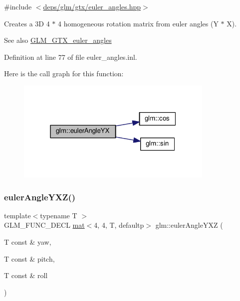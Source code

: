 {\ttfamily \#include $<$\hyperlink{euler__angles_8hpp}{deps/glm/gtx/euler\+\_\+angles.\+hpp}$>$}

Creates a 3D 4 $\ast$ 4 homogeneous rotation matrix from euler angles (Y $\ast$ X). \begin{DoxySeeAlso}{See also}
\hyperlink{group__gtx__euler__angles}{G\+L\+M\+\_\+\+G\+T\+X\+\_\+euler\+\_\+angles} 
\end{DoxySeeAlso}


Definition at line 77 of file euler\+\_\+angles.\+inl.

Here is the call graph for this function\+:
\nopagebreak
\begin{figure}[H]
\begin{center}
\leavevmode
\includegraphics[width=268pt]{d2/d7e/group__gtx__euler__angles_ga4f57e6dd25c3cffbbd4daa6ef3f4486d_cgraph}
\end{center}
\end{figure}
\mbox{\label{group__gtx__euler__angles_gab8ba99a9814f6d9edf417b6c6d5b0c10}} 
\subsubsection{\texorpdfstring{euler\+Angle\+Y\+X\+Z()}{eulerAngleYXZ()}}
{\footnotesize\ttfamily template$<$typename T $>$ \\
G\+L\+M\+\_\+\+F\+U\+N\+C\+\_\+\+D\+E\+CL \hyperlink{structglm_1_1mat}{mat}$<$4, 4, T, defaultp$>$ glm\+::euler\+Angle\+Y\+XZ (\begin{DoxyParamCaption}\item[{T const \&}]{yaw,  }\item[{T const \&}]{pitch,  }\item[{T const \&}]{roll }\end{DoxyParamCaption})}



